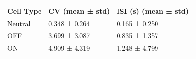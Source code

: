 \begin{tabular}{lll}
\toprule
Cell Type & CV (mean ± std) & ISI (s) (mean ± std) \\
\midrule
Neutral & 0.348 ± 0.264 & 0.165 ± 0.250 \\
OFF & 3.699 ± 3.087 & 0.835 ± 1.357 \\
ON & 4.909 ± 4.319 & 1.248 ± 4.799 \\
\bottomrule
\end{tabular}
